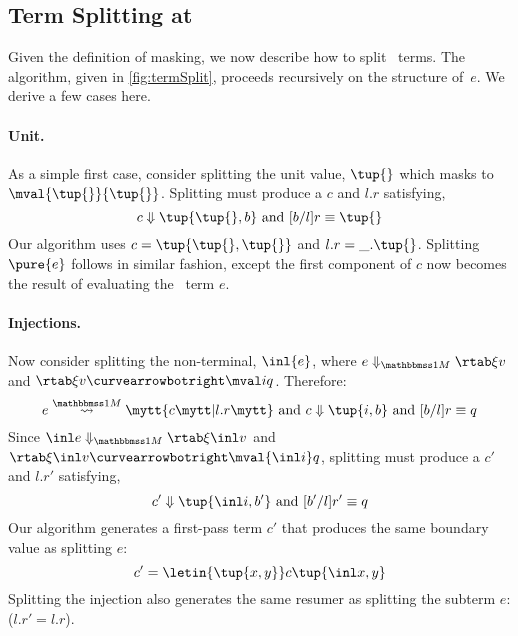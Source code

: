 \begin{abstrsyn}



\subsection{Term Splitting at \bbonem}
\label{sec:split-one}

Given the definition of masking, we now describe how to split
\bbonem\ terms. The algorithm, given in \cref{fig:termSplit}, proceeds
recursively on the structure of~$e$. We derive a few cases here.

\paragraph {Unit.} 
As a simple first case, consider splitting the unit value, $\tup{}$
which masks to $\mval {\tup{}} {\tup{}}$.
Splitting must produce a $c$ and $l.r$ satisfying,
\[
	\reduce c {\tup{\tup{},b}} \text{ and } [b/l]r \equiv \tup{}
\]
Our algorithm uses $c=\tup{\tup{},\tup{}}$ and $l.r = \_.\tup{}$.
Splitting $\pure{e}$ follows in similar fashion, except the first 
component of $c$ now becomes the result of evaluating the \bbonep\ term $e$.

\paragraph {Injections.}
Now consider splitting the non-terminal, $\inl {e}$, where $\diaone
{e} \xi v$ and $\rtab \xi v \vsplito \mval i q$. Therefore:
\[
	\splitone e A c {l.r} \text{ and } \reduce c {\tup{i,b}} \text{ and } [b/l]r \equiv q
\]
Since $\diaone {\inl e} \xi {\inl v}$ and $\rtab \xi {\inl v} \vsplito \mval {\inl i} q$,
splitting must produce a $c'$ and $l.r'$ satisfying,
\[
	\reduce {c'} {\tup{\inl i,b'}} \text{ and } [b'/l]r' \equiv q
\]
Our algorithm generates a first-pass term $c'$ that produces the same
boundary value as splitting $e$:
\[
c' = \letin {\tup {x,y}} c {\tup{\inl x, y}}
\]
Splitting the injection also generates the same resumer as splitting
the subterm $e$: ($l.r' = l.r$).


\end{abstrsyn}
